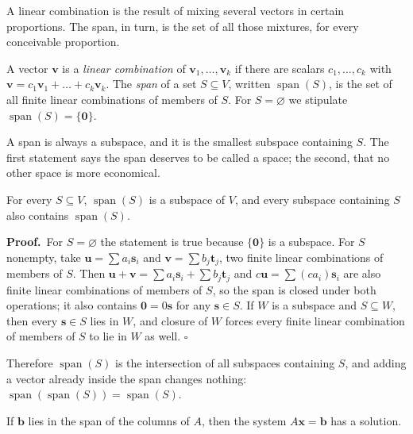 A linear combination is the result of mixing several vectors in certain proportions. The span, in
turn, is the set of all those mixtures, for every conceivable proportion.

\begin{definisi}
A vector $\mathbf{v}$ is a \emph{linear combination} of
$\mathbf{v}_{1},\dots,\mathbf{v}_{k}$ if there are scalars $c_{1},\dots,c_{k}$ with
$\mathbf{v}=c_{1}\mathbf{v}_{1}+\dots+c_{k}\mathbf{v}_{k}$. The \emph{span} of a set
$S\subseteq V$, written $\operatorname{span}(S)$, is the set of all finite linear combinations
of members of $S$. For $S=\varnothing$ we stipulate
$\operatorname{span}(S)=\{\mathbf{0}\}$.
\end{definisi}

A span is always a subspace, and it is the smallest subspace containing $S$. The first statement
says the span deserves to be called a space; the second, that no other space is more economical.

\begin{lemma}
For every $S\subseteq V$, $\operatorname{span}(S)$ is a subspace of $V$, and every subspace
containing $S$ also contains $\operatorname{span}(S)$.
\end{lemma}

\par\medskip\noindent\textbf{Proof.}\ 
For $S=\varnothing$ the statement is true because $\{\mathbf{0}\}$ is a subspace. For $S$
nonempty, take $\mathbf{u}=\sum a_{i}\mathbf{s}_{i}$ and $\mathbf{v}=\sum b_{j}\mathbf{t}_{j}$,
two finite linear combinations of members of $S$. Then
$\mathbf{u}+\mathbf{v}=\sum a_{i}\mathbf{s}_{i}+\sum b_{j}\mathbf{t}_{j}$ and
$c\mathbf{u}=\sum (ca_{i})\mathbf{s}_{i}$ are also finite linear combinations of members of $S$,
so the span is closed under both operations; it also contains $\mathbf{0}=0\mathbf{s}$ for any
$\mathbf{s}\in S$. If $W$ is a subspace and $S\subseteq W$, then every $\mathbf{s}\in S$ lies in
$W$, and closure of $W$ forces every finite linear combination of members of $S$ to lie in $W$
as well.
\hfill$\square$\par\medskip

Therefore $\operatorname{span}(S)$ is the intersection of all subspaces containing $S$, and
adding a vector already inside the span changes nothing:
$\operatorname{span}(\operatorname{span}(S))=\operatorname{span}(S)$.

If $\mathbf{b}$ lies in the span of the columns of $A$, then the system $A\mathbf{x}=\mathbf{b}$
has a solution.

